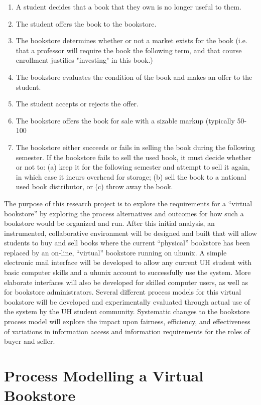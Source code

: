 \begin{enumerate}
\item A student decides that a book that they own is no longer useful to them.
\item The student offers the book to the bookstore.
\item The bookstore determines whether or not a market exists for the book
     (i.e. that a professor will require the book the following term, and
     that course enrollment justifies "investing" in this book.)
\item The bookstore evaluates the condition of the book and makes an offer
     to the student.
\item The student accepts or rejects the offer.
\item The bookstore offers the book for sale with a sizable markup (typically 50-100%
\item The bookstore either succeeds or fails in selling the book during the
     following semester.  If the bookstore fails to sell the used book, it
     must decide whether or not to: (a) keep it for the following semester
     and attempt to sell it again, in which case it incurs overhead for storage;
     (b) sell the book to a national used book distributor, or (c) throw
     away the book.  
\end{enumerate}

The purpose of this research project is to explore the requirements for a
``virtual bookstore'' by exploring the process alternatives and outcomes
for how such a bookstore would be organized and run.  After this initial
analysis, an instrumented, collaborative environment will be designed and
built that will allow students to buy and sell books where the current
``physical'' bookstore has been replaced by an on-line, ``virtual''
bookstore running on uhunix.  A simple electronic mail interface will be
developed to allow any current UH student with basic computer skills and a
uhunix account to successfully use the system.  More elaborate interfaces
will also be developed for skilled computer users, as well as for bookstore
administrators.  Several different process models for this virtual
bookstore will be developed and experimentally evaluated through actual use
of the system by the UH student community.  Systematic changes to the
bookstore process model will explore the impact upon fairness, efficiency,
and effectiveness of variations in information access and information
requirements for the roles of buyer and seller.

\section{Process Modelling a Virtual Bookstore}

